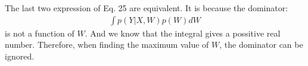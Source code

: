 \documentclass[12pt]{article}
\newenvironment{question}[2][Question]{\begin{trivlist}
\kern10pt
\item[\hskip \labelsep {\bfseries #1}\hskip \labelsep {\bfseries #2.}]}{\end{trivlist}}
\begin{document}
\begin{question}{14}
  
The last two expression of Eq. 25 are equivalent. It is because the dominator:
  \begin{align*} %
    \int p(Y|X, W)p(W)dW
  \end{align*}
is not a function of $W$. And we know that the integral gives a possitive real number.
Therefore, when finding the maximum value of $W$, the dominator can be ignored.

\end{question}

\end{document}
